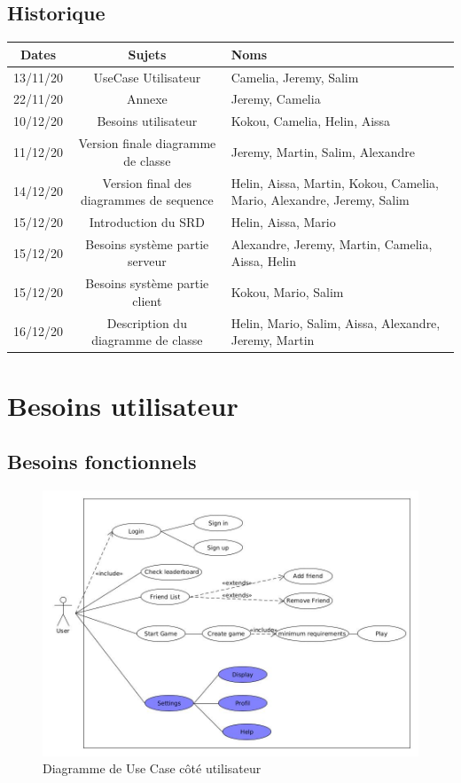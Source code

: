 \documentclass[a4paper,12pt]{article}
\begin{document}
\subsection{Historique}
\begin{tabularx}{15cm}{|c|c|X|}
	\hline
		Dates & Sujets & Noms \\
	\hline
		13/11/20 & UseCase Utilisateur & Camelia, Jeremy, Salim \\
	\hline
		22/11/20 & Annexe & Jeremy, Camelia \\
	\hline
		10/12/20 & Besoins utilisateur & Kokou, Camelia, Helin, Aissa\\
	\hline
		11/12/20 & Version finale diagramme de classe  & Jeremy, Martin, Salim, Alexandre\\
	\hline
		14/12/20 & Version final des diagrammes de sequence & Helin, Aissa, Martin, Kokou, Camelia, 
		Mario, Alexandre, Jeremy, Salim\\
	\hline
		15/12/20 & Introduction du SRD & Helin, Aissa, Mario\\
	\hline
		15/12/20 & Besoins système partie serveur & Alexandre, Jeremy, Martin, Camelia, Aissa, Helin\\
	\hline
		15/12/20 & Besoins système partie client & Kokou, Mario, Salim\\
	\hline
		16/12/20 & Description du diagramme de classe & Helin, Mario, Salim, Aissa,
		Alexandre, Jeremy, Martin\\
	\hline

\end{tabularx}

\section{Besoins utilisateur}

\subsection{Besoins fonctionnels}


\begin{figure}[h!]
\centering
\includegraphics[width=15cm]{images/UserUseCase.jpg}
\caption{Diagramme de Use Case côté utilisateur}
\label{fig:UserUseCase}
\end{figure}
\end{document}
